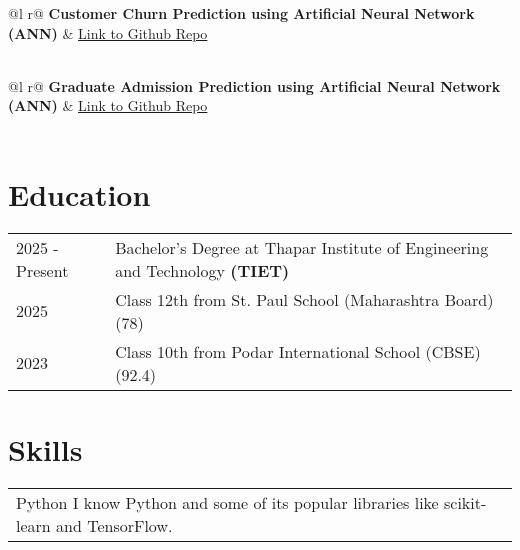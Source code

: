\documentclass[a4paper,12pt]{article}
\begin{document}
\begin{tabularx}{\linewidth}{ @{}l r@{} }
\textbf{Customer Churn Prediction using Artificial Neural Network (ANN)} & \hfill \href{https://github.com/LakshThakre/DeepLearning}{Link to Github Repo} \\[3.75pt]
  \\
\end{tabularx}

\begin{tabularx}{\linewidth}{ @{}l r@{} }
\textbf{Graduate Admission Prediction using Artificial Neural Network (ANN)} & \hfill \href{https://github.com/LakshThakre/DeepLearning}{Link to Github Repo} \\[3.75pt]
  \\
\end{tabularx}

\section{Education}
\begin{tabularx}{\linewidth}{@{}l X@{}}
2025 - Present & Bachelor's Degree at Thapar Institute of Engineering and Technology \textbf{(TIET)}\\ 

2025 & Class 12th from St. Paul School (Maharashtra Board) \hfill  (78) \\

2023 & Class 10th from Podar International School (CBSE) \hfill  (92.4) \\
\end{tabularx}


\section{Skills}
\begin{tabularx}{\linewidth}{@{}l X@{}}
Python  \normalsize{I know Python and some of its popular libraries like scikit-learn and TensorFlow.}\\ 
\end{tabularx}


\vfill
{}
\end{document}
